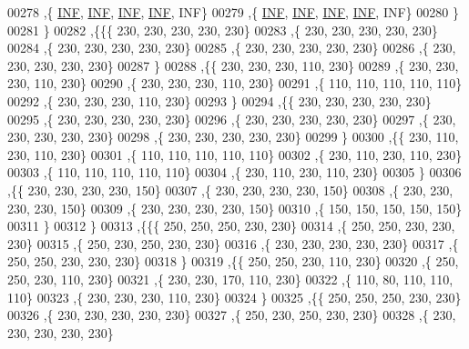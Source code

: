 \begin{DoxyCode}
00278    ,\{   \hyperlink{constants_8h_a12c2040f25d8e3a7b9e1c2024c618cb6}{INF},   \hyperlink{constants_8h_a12c2040f25d8e3a7b9e1c2024c618cb6}{INF},   \hyperlink{constants_8h_a12c2040f25d8e3a7b9e1c2024c618cb6}{INF},   \hyperlink{constants_8h_a12c2040f25d8e3a7b9e1c2024c618cb6}{INF},   INF\}
00279    ,\{   \hyperlink{constants_8h_a12c2040f25d8e3a7b9e1c2024c618cb6}{INF},   \hyperlink{constants_8h_a12c2040f25d8e3a7b9e1c2024c618cb6}{INF},   \hyperlink{constants_8h_a12c2040f25d8e3a7b9e1c2024c618cb6}{INF},   \hyperlink{constants_8h_a12c2040f25d8e3a7b9e1c2024c618cb6}{INF},   INF\}
00280    \}
00281   \}
00282  ,\{\{\{   230,   230,   230,   230,   230\}
00283    ,\{   230,   230,   230,   230,   230\}
00284    ,\{   230,   230,   230,   230,   230\}
00285    ,\{   230,   230,   230,   230,   230\}
00286    ,\{   230,   230,   230,   230,   230\}
00287    \}
00288   ,\{\{   230,   230,   230,   110,   230\}
00289    ,\{   230,   230,   230,   110,   230\}
00290    ,\{   230,   230,   230,   110,   230\}
00291    ,\{   110,   110,   110,   110,   110\}
00292    ,\{   230,   230,   230,   110,   230\}
00293    \}
00294   ,\{\{   230,   230,   230,   230,   230\}
00295    ,\{   230,   230,   230,   230,   230\}
00296    ,\{   230,   230,   230,   230,   230\}
00297    ,\{   230,   230,   230,   230,   230\}
00298    ,\{   230,   230,   230,   230,   230\}
00299    \}
00300   ,\{\{   230,   110,   230,   110,   230\}
00301    ,\{   110,   110,   110,   110,   110\}
00302    ,\{   230,   110,   230,   110,   230\}
00303    ,\{   110,   110,   110,   110,   110\}
00304    ,\{   230,   110,   230,   110,   230\}
00305    \}
00306   ,\{\{   230,   230,   230,   230,   150\}
00307    ,\{   230,   230,   230,   230,   150\}
00308    ,\{   230,   230,   230,   230,   150\}
00309    ,\{   230,   230,   230,   230,   150\}
00310    ,\{   150,   150,   150,   150,   150\}
00311    \}
00312   \}
00313  ,\{\{\{   250,   250,   250,   230,   230\}
00314    ,\{   250,   250,   230,   230,   230\}
00315    ,\{   250,   230,   250,   230,   230\}
00316    ,\{   230,   230,   230,   230,   230\}
00317    ,\{   250,   250,   230,   230,   230\}
00318    \}
00319   ,\{\{   250,   250,   230,   110,   230\}
00320    ,\{   250,   250,   230,   110,   230\}
00321    ,\{   230,   230,   170,   110,   230\}
00322    ,\{   110,    80,   110,   110,   110\}
00323    ,\{   230,   230,   230,   110,   230\}
00324    \}
00325   ,\{\{   250,   250,   250,   230,   230\}
00326    ,\{   230,   230,   230,   230,   230\}
00327    ,\{   250,   230,   250,   230,   230\}
00328    ,\{   230,   230,   230,   230,   230\}

\end{DoxyCode}
